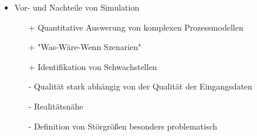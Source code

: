 \documentclass[11pt,a4paper]{article}
\begin{document}
\begin{itemize}
\item Vor- und Nachteile von Simulation
	\begin{itemize}
	\item[+] Quantitative Auswerung von komplexen Prozessmodellen
	\item[+] "Was-Wäre-Wenn Szenarien"
	\item[+] Identifikation von Schwachstellen
	\item[-] Qualität stark abhängig von der Qualität der Eingangsdaten
	\item[-] Realitätsnähe
	\item[-] Definition von Störgrößen besonders problematisch	
	
	\end{itemize}

\end{itemize}
\pagebreak
\end{document}
